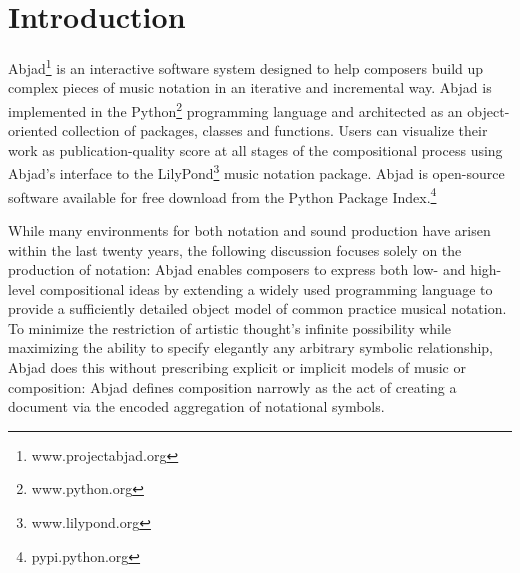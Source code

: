 \section{Introduction}\label{sec:introduction}

\begin{comment}
1. Changed "composers, music theorists and musicologists" to just "composers". How do we feel about this?
\end{comment}

Abjad\footnote{www.projectabjad.org} is an interactive software system designed
to help composers build up complex pieces of music notation in an iterative and
incremental way. Abjad is implemented in the Python\footnote{www.python.org}
programming language and architected as an object-oriented collection of
packages, classes and functions. Users can visualize their work as
publication-quality score at all stages of the compositional process using
Abjad's interface to the LilyPond\footnote{www.lilypond.org} music notation
package. Abjad is open-source software available for free download from the
Python Package Index.\footnote{pypi.python.org}

While many environments for both notation and sound production have arisen
within the last twenty years, the following discussion focuses solely on the
production of notation: Abjad enables composers to express both low- and
high-level compositional ideas by extending a widely used programming language
to provide a sufficiently detailed object model of common practice musical
notation. To minimize the restriction of artistic thought's infinite
possibility while maximizing the ability to specify elegantly any arbitrary
symbolic relationship, Abjad does this without prescribing explicit or implicit
models of music or composition: Abjad defines composition narrowly as the act
of creating a document via the encoded aggregation of notational symbols.

\begin{comment}
The current version of Abjad implements 491 public classes and 324 public
functions.
\end{comment}